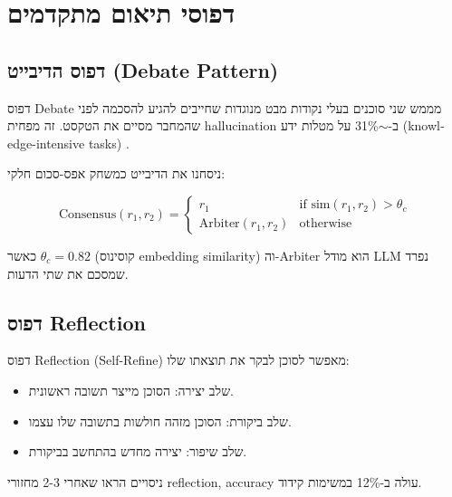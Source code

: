 
\clearpage
\chapter{דפוסי תיאום מתקדמים}

\section{דפוס הדיבייט (\textenglish{Debate Pattern})}

דפוס \textenglish{Debate} מממש שני סוכנים בעלי נקודות מבט מנוגדות שחייבים להגיע להסכמה לפני שהמחבר מסיים את הטקסט. זה מפחית \textenglish{hallucination} ב-\textenglish{$\sim$31\%} על מטלות ידע (\textenglish{knowledge-intensive tasks}) \cite{segal2024orchestration}.

ניסחנו את הדיבייט כמשחק אפס-סכום חלקי:

\begin{equation}
\text{Consensus}(r_1, r_2) = \begin{cases} r_1 & \text{if } \text{sim}(r_1, r_2) > \theta_c \\ \text{Arbiter}(r_1, r_2) & \text{otherwise} \end{cases}
\end{equation}

כאשר \(\theta_c = 0.82\) (קוסינוס \textenglish{embedding similarity}) וה-\textenglish{Arbiter} הוא מודל \textenglish{LLM} נפרד שמסכם את שתי הדעות.

\section{דפוס \textenglish{Reflection}}

דפוס \textenglish{Reflection} (\textenglish{Self-Refine}) \cite{wu2023autogen} מאפשר לסוכן לבקר את תוצאתו שלו:

\begin{itemize}
\item שלב יצירה: הסוכן מייצר תשובה ראשונית.
\item שלב ביקורת: הסוכן מזהה חולשות בתשובה שלו עצמו.
\item שלב שיפור: יצירה מחדש בהתחשב בביקורת.
\end{itemize}

ניסויים הראו שאחרי \textenglish{2-3} מחזורי \textenglish{reflection}, \textenglish{accuracy} עולה ב-\textenglish{12\%} במשימות קידוד.
